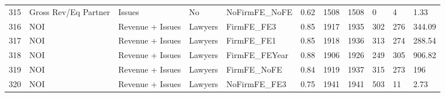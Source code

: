 \documentclass{article}
\begin{document}
\begin{table}[H]
\begin{tabular}{rllllllllll}
  315 & Gross Rev/Eq Partner & Issues & No & NoFirmFE\_NoFE & 0.62 & 1508 & 1508 & 0 & 4 & 1.33 \\ 
  316 & NOI & Revenue + Issues & Lawyers & FirmFE\_FE3 & 0.85 & 1917 & 1935 & 302 & 276 & 344.09 \\ 
  317 & NOI & Revenue + Issues & Lawyers & FirmFE\_FE1 & 0.85 & 1918 & 1936 & 313 & 274 & 288.54 \\ 
  318 & NOI & Revenue + Issues & Lawyers & FirmFE\_FEYear & 0.88 & 1906 & 1926 & 249 & 305 & 906.82 \\ 
  319 & NOI & Revenue + Issues & Lawyers & FirmFE\_NoFE & 0.84 & 1919 & 1937 & 315 & 273 & 196 \\ 
  320 & NOI & Revenue + Issues & Lawyers & NoFirmFE\_FE3 & 0.75 & 1941 & 1941 & 503 & 11 & 2.73 \\ 
   \hline
\end{tabular}
\end{table}
\end{document}
